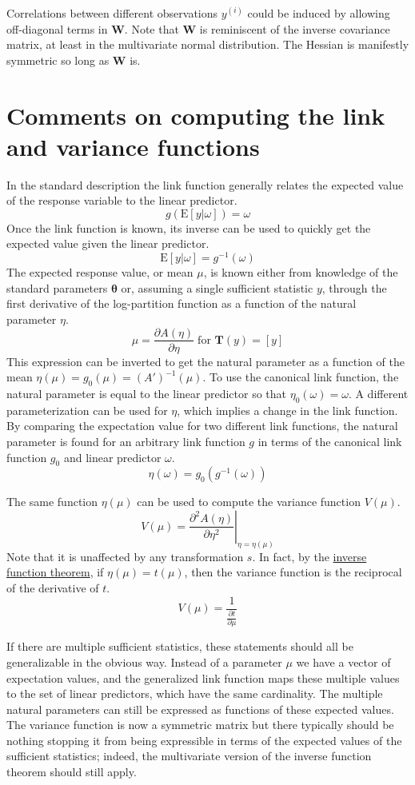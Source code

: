 \documentclass{article}
\begin{document}
Correlations between different observations \(y^{(i)}\) could be induced by
allowing off-diagonal terms in \(\mathbf{W}\). Note that \(\mathbf{W}\) is
reminiscent of the inverse covariance matrix, at least in the multivariate
normal distribution. The Hessian is manifestly symmetric so long as
\(\mathbf{W}\) is.

\section{Comments on computing the link and variance functions}

In the standard description the link function generally relates the expected
value of the response variable to the linear predictor.
\[ g(\textrm{E}[y|\omega]) = \omega \]
Once the link function is known, its inverse can be used to quickly get the
expected value given the linear predictor.
\[ \textrm{E}[y|\omega] = g^{-1}(\omega) \]
The expected response value, or mean \(\mu\), is known either from knowledge
of the standard parameters \(\boldsymbol{\theta}\) or, assuming a single
sufficient statistic \(y\), through the first derivative of the log-partition
function as a function of the natural parameter \(\eta\).
\[ \mu = \frac{\partial A(\eta)}{\partial \eta} \; \textrm{for } \mathbf{T}(y)
= [y]\]
This expression can be inverted to get the natural parameter as a function of the
mean \(\eta(\mu) = g_0(\mu) = (A')^{-1}(\mu)\).
To use the canonical link function, the natural parameter is equal to the linear
predictor so that \( \eta_0(\omega) = \omega \).
A different parameterization can be used for \(\eta\), which implies a change
in the link function.
By comparing the expectation value for
two different link functions, the natural parameter is found for an arbitrary link
function $g$ in terms of the canonical link function $g_0$ and linear predictor
$\omega$.
\[ \eta(\omega) = g_0 \left( g^{-1} (\omega) \right) \]

The same function \(\eta(\mu)\) can be used to compute the variance function
\(V(\mu)\).
\[ V(\mu) = \left. \frac{\partial^2 A(\eta)}{\partial \eta^2} \right|_{\eta = \eta(\mu)} \]
Note that it is unaffected by any transformation \(s\).
In fact, by the \href{https://en.wikipedia.org/wiki/Inverse_function_theorem}{inverse function
theorem}, if
\(\eta(\mu) = t(\mu)\), then the variance function is the reciprocal of the
derivative of \(t\).
\[ V(\mu) = \frac{1}{\frac{\partial t}{\partial \mu}} \]

If there are multiple sufficient statistics, these statements should all be
generalizable in the obvious way.
Instead of a parameter \(\mu\) we have a vector of expectation values, and the
generalized link function maps these multiple values to the set of linear
predictors, which have the same cardinality.
The multiple natural parameters can still be expressed as functions of these
expected values.
The variance function is now a symmetric matrix but there typically should be
nothing stopping it from being expressible in terms of the expected values of
the sufficient statistics; indeed, the multivariate version of the inverse
function theorem should still apply.
\end{document}
